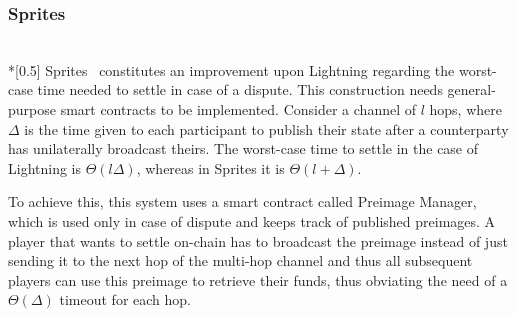 \subsubsection{Sprites} \ \\*[0.5\baselineskip]
  Sprites~\cite{sprites} constitutes an improvement upon Lightning regarding the
  worst-case time needed to settle in case of a dispute. This construction needs
  general-purpose smart contracts to be implemented. Consider a channel of $l$ hops, where
  $\Delta$ is the time given to each participant to publish their state after a
  counterparty has unilaterally broadcast theirs. The worst-case time to settle in the
  case of Lightning is $\Theta\left(l\Delta\right)$, whereas in Sprites it is
  $\Theta\left(l + \Delta\right)$.

  To achieve this, this system uses a smart contract called Preimage Manager, which is
  used only in case of dispute and keeps track of published preimages. A player that wants
  to settle on-chain has to broadcast the preimage instead of just sending it to the next
  hop of the multi-hop channel and thus all subsequent players can use this preimage to
  retrieve their funds, thus obviating the need of a $\Theta\left(\Delta\right)$ timeout
  for each hop.
